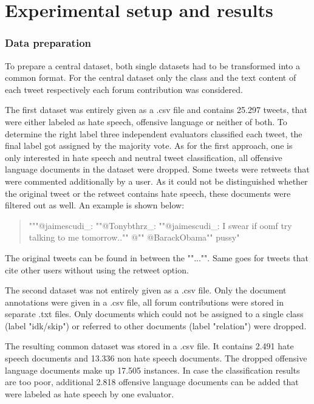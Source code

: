 \section{Experimental setup and results} \label{results}

\subsubsection{Data preparation}

To prepare a central dataset, both single datasets had to be transformed into a common format. For the central dataset only the class and the text content of each tweet respectively each forum contribution was considered.

The first dataset  was entirely given as a .csv file and contains 25.297 tweets, that were either labeled as hate speech, offensive language or neither of both. To determine the right label three independent evaluators classified each tweet, the final label got assigned by the majority vote. As for the first approach, one is only interested in hate speech and neutral tweet classification, all offensive language documents in the dataset were dropped. Some tweets were retweets that were commented additionally by a user. As it could not be distinguished whether the original tweet or the retweet contains hate speech, these documents were filtered out as well. An example is shown below:

\begin{quote}
    """@jaimescudi\_: ""@Tonybthrz\_: ""@jaimescudi\_: I swear if oomf try talking to me tomorrow.."" @"" @BarackObama"" pussy"
\end{quote}

The original tweets can be found in between the ""..."". Same goes for tweets that cite other users without using the retweet option.

\vspace{0.5cm}

The second dataset  was not entirely given as a .csv file. Only the document annotations were given in a .csv file, all forum contributions were stored in separate .txt files. Only documents which could not be assigned to a single class (label "idk/skip") or referred to other documents (label "relation") were dropped.

The resulting common dataset was stored in a .csv file. It contains 2.491 hate speech documents and 13.336 non hate speech documents. The dropped offensive language documents make up 17.505 instances. In case the classification results are too poor, additional 2.818 offensive language documents can be added that were labeled as hate speech by one evaluator.

